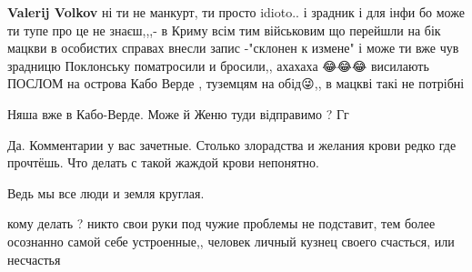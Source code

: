 \begin{itemize}
\begin{itemize}
 
\textbf{Valerij Volkov} ні ти не манкурт, ти просто idioto.. і зрадник
і для інфи бо може ти тупе про це не знаєш,,,-
в Криму всім тим військовим що перейшли на бік мацкви в особистих справах внесли запис -"склонен к измене"
і може ти вже чув зрадницю Поклонську поматросили и бросили,, ахахаха 😂😂😂
висилають ПОСЛОМ на острова Кабо Верде , туземцям на обід😜,, в мацкві такі не потрібні

 
Няша вже в Кабо-Верде.
Може й Женю туди відправимо ?
Гг

\end{itemize}

 

Да. Комментарии у вас зачетные. Столько злорадства и желания крови редко где
прочтёшь. Что делать с такой жаждой крови непонятно.

Ведь мы все люди и земля круглая.

\begin{itemize}
 
кому делать ? никто свои руки под чужие проблемы не подставит, тем более осознанно самой себе устроенные,, человек личный кузнец своего счасться, или несчастья
\end{itemize}

 


\end{itemize}
